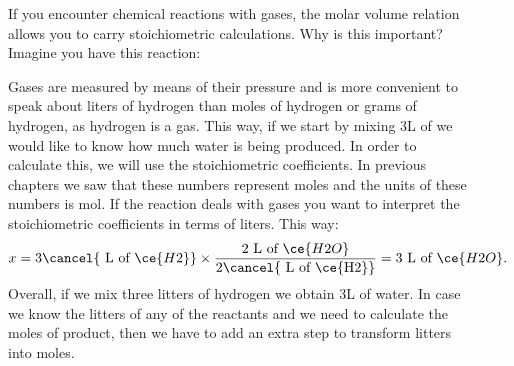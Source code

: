 \documentclass[main.tex]{subfiles}
\begin{document}
\begin{description}
\item[] If you encounter chemical reactions with gases, the molar volume relation allows you to carry stoichiometric calculations. Why is this important? Imagine you have this reaction:
\begin{center} \end{center}
Gases are measured by means of their pressure and is more convenient to speak about liters of hydrogen than moles of hydrogen or grams of hydrogen, as hydrogen is a gas. This way, if we start by mixing 3L of  we would like to know how much water is being produced. In order to calculate this, we will use the stoichiometric coefficients. In previous chapters we saw that these numbers represent moles and the units of these numbers is mol. If the reaction deals with gases you want to interpret the stoichiometric coefficients in terms of liters. This way:
\begin{equation*}
x=3\cancel{\text{ L of }\ce{H2}} \times \dfrac{\text{2 L of }\ce{H2O}}{2\cancel{\text{ L of \ce{H2}}}}=3\text{ L of }\ce{H2O}.
\end{equation*}
Overall, if we mix three litters of hydrogen we obtain 3L of water.
In case we know the litters of any of the reactants and we need to calculate the moles of product, then we have to add an extra step to transform litters into moles.



\end{description}
\end{document}
